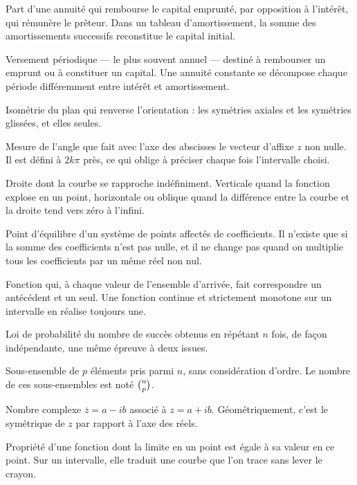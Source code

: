 Part d'une annuité qui rembourse le capital emprunté, par opposition à
l'intérêt, qui rémunère le prêteur. Dans un tableau d'amortissement, la
somme des amortissements successifs reconstitue le capital initial.

Versement périodique — le plus souvent annuel — destiné à rembourser un
emprunt ou à constituer un capital. Une annuité constante se décompose
chaque période différemment entre intérêt et amortissement.

Isométrie du plan qui renverse l'orientation : les symétries axiales et les
symétries glissées, et elles seules.

Mesure de l'angle que fait avec l'axe des abscisses le vecteur d'affixe $z$
non nulle. Il est défini à $2k\pi$ près, ce qui oblige à préciser chaque fois
l'intervalle choisi.

Droite dont la courbe se rapproche indéfiniment. Verticale quand la fonction
explose en un point, horizontale ou oblique quand la différence entre la
courbe et la droite tend vers zéro à l'infini.


Point d'équilibre d'un système de points affectés de coefficients. Il n'existe
que si la somme des coefficients n'est pas nulle, et il ne change pas quand on
multiplie tous les coefficients par un même réel non nul.

Fonction qui, à chaque valeur de l'ensemble d'arrivée, fait correspondre un
antécédent et un seul. Une fonction continue et strictement monotone sur un
intervalle en réalise toujours une.

Loi de probabilité du nombre de succès obtenus en répétant $n$ fois, de façon
indépendante, une même épreuve à deux issues.


Sous-ensemble de $p$ éléments pris parmi $n$, sans considération d'ordre. Le
nombre de ces sous-ensembles est noté $\combi{p}{n}$.

Nombre complexe $\overline z = a-ib$ associé à $z = a+ib$. Géométriquement,
c'est le symétrique de $z$ par rapport à l'axe des réels.

Propriété d'une fonction dont la limite en un point est égale à sa valeur en
ce point. Sur un intervalle, elle traduit une courbe que l'on trace sans lever
le crayon.


